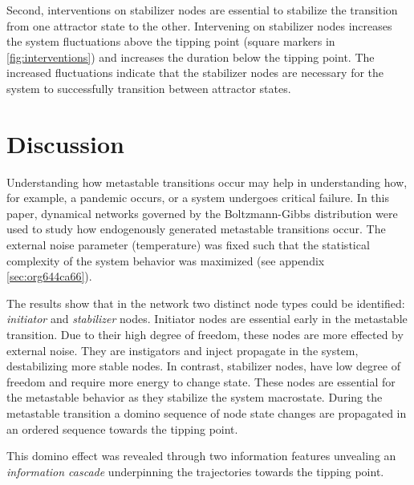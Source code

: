 \documentclass[a4paper, 11pt, twocolumn]{article}
\begin{document}
Second, interventions  on stabilizer nodes are  essential to
stabilize  the transition  from one  attractor state  to the
other. Intervening on stabilizer  nodes increases the system
fluctuations  above the  tipping  point  (square markers  in
\cref{fig:interventions}) and  increases the  duration below
the tipping point. The  increased fluctuations indicate that
the  stabilizer  nodes  are  necessary  for  the  system  to
successfully transition between attractor states.

\section{Discussion}
\label{sec:org389dbab}
Understanding how  metastable transitions occur may  help in
understanding  how, for  example,  a pandemic  occurs, or  a
system undergoes critical failure.  In this paper, dynamical
networks governed  by the Boltzmann-Gibbs  distribution were
used   to  study   how  endogenously   generated  metastable
transitions    occur.   The    external   noise    parameter
(temperature) was fixed such that the statistical complexity
of  the  system behavior  was  maximized  (see appendix \ref{sec:org644ca66}).

The results show that in the network two distinct node types
could  be identified:  \emph{initiator}  and \emph{stabilizer}  nodes.
Initiator  nodes  are  essential  early  in  the  metastable
transition. Due to their high degree of freedom, these nodes
are more  effected by  external noise. They  are instigators
and  inject  propagate  in the  system,  destabilizing  more
stable nodes. In contrast, stabilizer nodes, have low degree
of freedom  and require more  energy to change  state. These
nodes  are essential  for  the metastable  behavior as  they
stabilize  the  system  macrostate.  During  the  metastable
transition  a  domino sequence  of  node  state changes  are
propagated in an ordered sequence towards the tipping point.

This  domino effect  was  revealed  through two  information
features unvealing an \emph{information cascade} underpinning the
trajectories towards the tipping point.
\end{document}
